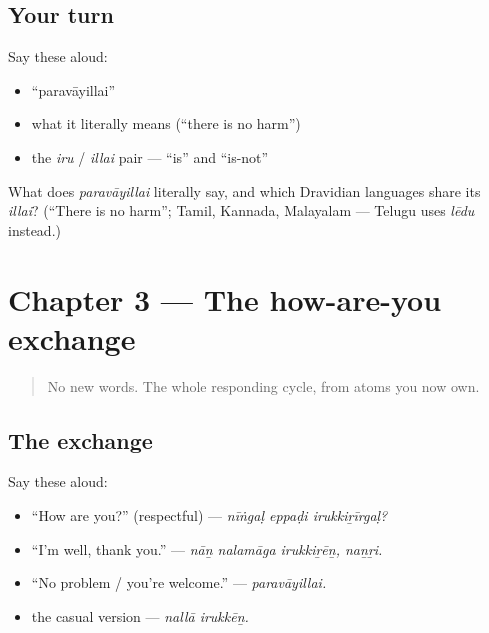 \subsection*{Your turn}
Say these aloud:

\begin{itemize}
\raggedright
  \item \textquotedblleft{}paravāyillai\textquotedblright{}
  \item what it literally means (\textquotedblleft{}there is no harm\textquotedblright{})
  \item the \emph{iru} / \emph{illai} pair — \textquotedblleft{}is\textquotedblright{} and \textquotedblleft{}is-not\textquotedblright{}
\end{itemize}

\begin{tcolorbox}[breakable,colback=teal!4,colframe=teal!35!black,title={Before you move on}]
What does \emph{paravāyillai} literally say, and which Dravidian languages share its \emph{illai}? (\textquotedblleft{}There is no harm\textquotedblright{}; Tamil, Kannada, Malayalam — Telugu uses \emph{lēdu} instead.)
\end{tcolorbox}
\section[Practice]{Chapter 3 — The how-are-you exchange}

\label{lesson:TA-C03-practice}



\begin{quote}
No new words. The whole responding cycle, from atoms you now own.
\end{quote}

\subsection*{The exchange}
Say these aloud:

\begin{itemize}
\raggedright
  \item \textquotedblleft{}How are you?\textquotedblright{} (respectful) — \emph{nīṅgaḷ eppaḍi irukkiṟīrgaḷ?}
  \item \textquotedblleft{}I'm well, thank you.\textquotedblright{} — \emph{nāṉ nalamāga irukkiṟēṉ, naṉṟi.}
  \item \textquotedblleft{}No problem / you're welcome.\textquotedblright{} — \emph{paravāyillai.}
  \item the casual version — \emph{nallā irukkēṉ.}
\end{itemize}

